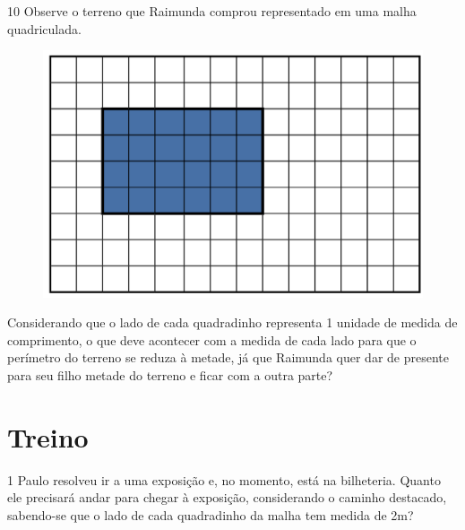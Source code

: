 \pagebreak

\num{10} Observe o terreno que Raimunda comprou representado em uma malha
quadriculada.

\begin{figure}[htpb!]
\centering
\includegraphics[width=\textwidth]{../ilustracoes/MAT5/SAEB_5ANO_MAT_figura45.png}
\end{figure}

Considerando que o lado de cada quadradinho representa 1 unidade de
medida de comprimento, o que deve acontecer com a medida de cada lado
para que o perímetro do terreno se reduza à metade, já que Raimunda quer
dar de presente para seu filho metade do terreno e ficar com a outra
parte?

\begin{mdframed}[linewidth=2pt,linecolor=salmao]
\mbox{}\vspace*{6cm}
\end{mdframed}

\pagebreak
\section{Treino}

\num{1} Paulo resolveu ir a uma exposição e, no momento, está na bilheteria. Quanto ele precisará andar para chegar à exposição,
considerando o caminho destacado, sabendo-se que o lado de cada quadradinho da malha tem medida de 2m?

